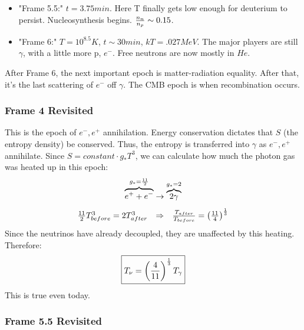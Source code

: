 \documentclass{article}
\def\imply{\Rightarrow}
\def\imply{\Rightarrow}
\begin{document}
\begin{itemize}
\item"Frame 5.5:" $t=3.75min$.  Here T finally gets low enough for deuterium
\def\nnnp{{n_n\over n_p}}
to persist.  Nucleosynthesis begins. $\nnnp\sim0.15$.

\item"Frame 6:" $T=10^{8.5}K$, $t\sim30min$, $kT=.027MeV$.  The major players
are still $\gamma$, with a little more p, $e^-$.  Free neutrons are now
mostly in $He$.\par
\end{itemize}

After Frame 6, the next important epoch is matter-radiation equality.  After
that, it's the last scattering of $e^-$ off $\gamma$.  The CMB epoch is
when recombination occurs.

\subsubsection*{ Frame 4 Revisited}

\def\e{e^-}
\def\ep{e^+}
This is the epoch of $\e,\ep$ annihilation.  Energy conservation dictates
that $S$ (the entropy density) be conserved.  Thus, the entropy is transferred
into $\gamma$ as $\e, \ep$ annihilate.  Since $S=constant\cdot g_*T^3$, we
can calculate how much the photon gas was heated up in this epoch:
$$\overbrace{\ep+\e}^{g_*={11\over2}}\to\overbrace{2\gamma}^{g_*=2}$$
$$\begin{matrix} {11\over2}T_{before}^3=2T_{after}^3&\imply&
{T_{after}\over T_{before}}=\left({11\over4}\right)^{1\over3}\end{matrix}$$
Since the neutrinos have already decoupled, they are unaffected by this
heating.  Therefore:
$$\boxed{T_\nu=\left({4\over11}\right)^{1\over3}T_\gamma}$$
This is true even today.

\subsubsection*{ Frame 5.5 Revisited}
\end{document}

